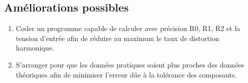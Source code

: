 \subsection{Améliorations possibles}
\begin{enumerate}
\item Coder un programme capable de calculer avec précision R0, R1, R2 et la tension d'entrée afin de réduire au maximum le taux de distortion harmonique.
\item S'arranger pour que les données pratiques soient plus proches des données théoriques afin de minimiser l'erreur dûe à la tolérance des composants.
\end{enumerate}


